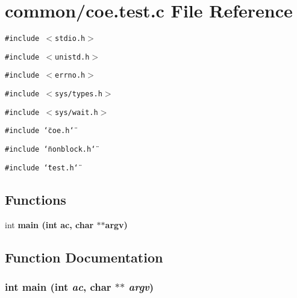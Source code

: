 \section{common/coe.test.c File Reference}
\label{coe_8test_8c}
{\tt \#include $<$stdio.h$>$}\par
{\tt \#include $<$unistd.h$>$}\par
{\tt \#include $<$errno.h$>$}\par
{\tt \#include $<$sys/types.h$>$}\par
{\tt \#include $<$sys/wait.h$>$}\par
{\tt \#include \char`\"{}coe.h\char`\"{}}\par
{\tt \#include \char`\"{}nonblock.h\char`\"{}}\par
{\tt \#include \char`\"{}test.h\char`\"{}}\par
\subsection*{Functions}
\begin{CompactItemize}
\item 
int \bf{main} (int ac, char $\ast$$\ast$argv)
\end{CompactItemize}


\subsection{Function Documentation}
\subsubsection{\setlength{\rightskip}{0pt plus 5cm}int main (int {\em ac}, char $\ast$$\ast$ {\em argv})}\label{coe_8test_8c_548d6289348d6503861746411dbb4db9}


